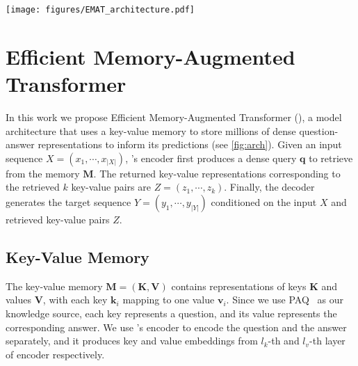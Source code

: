 \begin{figure*}[t]
\begin{center}
\texttt{[image: figures/EMAT\_architecture.pdf]}
\end{center}
\caption{
Architecture of the proposed Efficient Key-Value Memory Augmented Transformers (EMAT): factual knowledge is stored in a key-value memory (\cref{sec:kvm}) where keys and values correspond to questions and answers, respectively;
during inference, the model retrieves information from the memory via MIPS (\cref{sec:retriever}) and uses it to condition the generation process.
}
\label{fig:arch}
\end{figure*}

\section{Efficient Memory-Augmented Transformer}  \label{sec:emat}


In this work we propose Efficient Memory-Augmented Transformer (\ModelName), a model architecture that uses a key-value memory to store millions of dense question-answer representations to inform its predictions (see \cref{fig:arch}).
Given an input sequence $X=(x_1, \cdots, x_{|X|})$, \ModelName's encoder first produces a dense query $\mathbf{q}$ to retrieve from the memory $\mathbf{M}$.
The returned key-value representations corresponding to the retrieved $k$ key-value pairs are $Z = (z_1, \cdots, z_k)$.
Finally, the decoder generates the target sequence $Y=(y_1, \cdots, y_{|Y|})$ conditioned on the input $X$ and retrieved key-value pairs $Z$.




\subsection{Key-Value Memory} \label{sec:kvm}


The key-value memory $\mathbf{M}=(\mathbf{K}, \mathbf{V})$ contains representations of keys $\mathbf{K}$ and values $\mathbf{V}$, with each key $\mathbf{k}_i$ mapping to one value $\mathbf{v}_i$.
Since we use PAQ~\citep{paq} as our knowledge source, each key represents a question, and its value represents the corresponding answer.
We use \ModelName's encoder to encode the question and the answer separately, and it produces key and value embeddings from $l_k$-th and $l_v$-th layer of encoder respectively.


